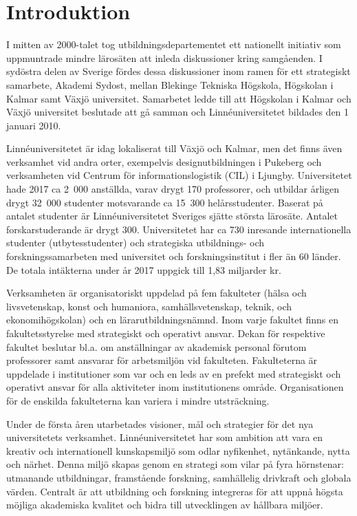\chapter{Introduktion}

I mitten av 2000-talet tog utbildningsdepartementet ett nationellt
initiativ som uppmuntrade mindre lärosäten att inleda diskussioner kring
samgåenden. I sydöstra delen av Sverige fördes dessa diskussioner inom
ramen för ett strategiskt samarbete, Akademi Sydost, mellan Blekinge
Tekniska Högskola, Högskolan i Kalmar samt Växjö universitet. Samarbetet
ledde till att Högskolan i Kalmar och Växjö universitet beslutade att gå
samman och Linnéuniversitetet bildades den 1 januari 2010.

Linnéuniversitetet är idag lokaliserat till Växjö och Kalmar, men det finns även
verksamhet vid andra orter, exempelvis designutbildningen i Pukeberg och
verksamheten vid Centrum för informationslogistik (CIL) i Ljungby.
Universitetet hade 2017 ca 2~000 anställda, varav drygt 170 professorer,
och utbildar årligen drygt 32~000 studenter motsvarande ca 15~300
helårsstudenter. Baserat på antalet studenter är Linnéuniversitetet Sveriges sjätte
största lärosäte. Antalet forskarstuderande är drygt 300. Universitetet
har ca 730 inresande internationella studenter (utbytesstudenter)
och strategiska utbildnings- och forskningssamarbeten med universitet
och forskningsinstitut i fler än 60 länder. De totala intäkterna under
år 2017 uppgick till 1,83 miljarder kr.

Verksamheten är organisatoriskt uppdelad på fem fakulteter (hälsa och
livsvetenskap, konst och humaniora, samhällsvetenskap, teknik, och
ekonomihögskolan) och en lärarutbildningsnämnd. Inom varje fakultet
finns en fakultetsstyrelse med strategiskt och operativt ansvar. Dekan
för respektive fakultet beslutar bl.a. om anställningar av akademisk
personal förutom professorer samt ansvarar för arbetsmiljön vid
fakulteten. Fakulteterna är uppdelade i institutioner som var och en
leds av en prefekt med strategiskt och operativt ansvar för alla
aktiviteter inom institutionens område. Organisationen för de enskilda
fakulteterna kan variera i mindre utsträckning.

Under de första åren utarbetades visioner, mål och strategier för det
nya universitetets verksamhet. Linnéuniversitetet har som ambition att vara en kreativ
och internationell kunskapsmiljö som odlar nyfikenhet, nytänkande, nytta
och närhet. Denna miljö skapas genom en strategi som vilar på fyra
hörnstenar: utmanande utbildningar, framstående forskning, samhällelig
drivkraft och globala värden. Centralt är att utbildning och forskning
integreras för att uppnå högsta möjliga akademiska kvalitet och bidra
till utvecklingen av hållbara miljöer.


